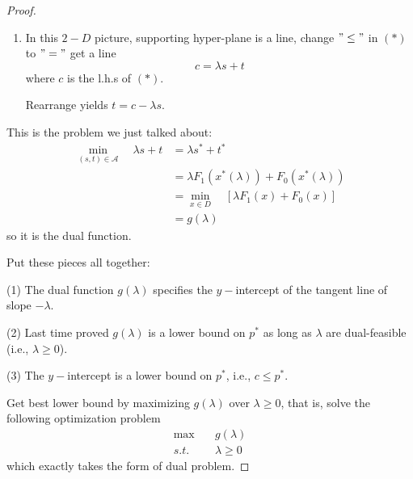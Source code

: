 \begin{proof}
\begin{enumerate}
	\item In this $2-D$ picture, supporting hyper-plane is a line, change $"\leq"$ in $(*)$ to $"="$ get a line 
	$$c =\lambda s + t$$
	where $c$ is the l.h.s of $(*)$.
	
	Rearrange yields $t = c - \lambda s$.
\end{enumerate}


This is the problem we just talked about:
\begin{align*}
	\min_{(s,t)\in \mathcal{A}} \quad \lambda s + t &= \lambda s^* + t^*\\
	&= \lambda F_1(x^*(\lambda)) + F_0(x^*(\lambda))\\
	&= \min_{x\in D} \quad[\lambda F_1(x) + F_0(x)]\\
	&= g(\lambda) 
\end{align*}
so it is the dual function.

Put these pieces all together:

	(1) The dual function $g(\lambda)$ specifies the $y-$intercept of the tangent line of slope $-\lambda$.
	
	(2) Last time proved $g(\lambda)$ is a lower bound on $p^*$ as long as $\lambda$ are dual-feasible (i.e., $\lambda \geq 0$).
	
	(3) The $y-$intercept is a lower bound on $p^*$, i.e., $c\leq p^{*}$.


Get best lower bound by maximizing $g(\lambda)$ over $\lambda \geq 0$, that is, solve the following optimization problem
\begin{align*}
	\max \quad &g(\lambda)\\
	s.t.\quad &\lambda \geq 0
\end{align*}
which exactly takes the form of dual problem.

\end{proof}






%
%
%


